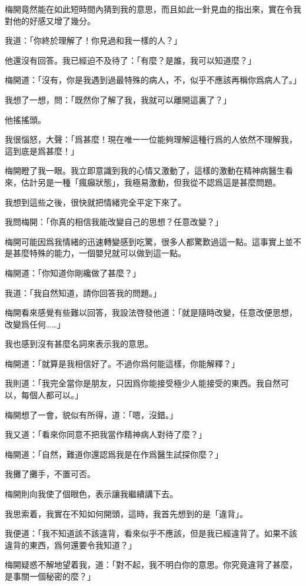 梅開竟然能在如此短時間內猜到我的意思，而且如此一針見血的指出來，實在令我對他的好感又增了幾分。

我道：「你終於理解了！你見過和我一樣的人？」

他還沒有回答。我已經迫不及待了：「有麼？是誰，我可以知道麼？」

梅開道：「沒有，你是我遇到過最特殊的病人，不，似乎不應該再稱你爲病人了。」

我想了一想，問：「既然你了解了我，我就可以離開這裏了？」

他搖搖頭。

我很惱怒，大聲：「爲甚麼！現在唯一一位能夠理解這種行爲的人依然不理解我，這到底是爲甚麼！」

梅開瞪了我一眼。我立即意識到我的心情又激動了，這樣的激動在精神病醫生看來，估計另是一種「瘋癲狀態」，我極易激動，但我從不認爲這是甚麼問題。

我想到這些之後，很快就把情緒完全平定下來了。

我問梅開：「你真的相信我能改變自己的思想？任意改變？」

梅開可能因爲我情緒的迅速轉變感到吃驚，很多人都驚歎過這一點。這事實上並不是甚麼特殊的能力，一個嬰兒就可以做到這一點。

梅開道：「你知道你剛纔做了甚麼？」

我道：「我自然知道，請你回答我的問題。」

梅開看來感覺有些難以回答，我設法啓發他道：「就是隨時改變，任意改便思想，改變爲任何……」

我也感到沒有甚麼名詞來表示我的意思。

梅開道：「就算是我相信好了。不過你爲何能這樣，你能解釋？」

我則道：「我完全當你是朋友，只因爲你能接受極少人能接受的東西。我自然可以，每個人都可以。」

梅開想了一會，貌似有所得，道：「嗯，沒錯。」

我又道：「看來你同意不把我當作精神病人對待了麼？」

梅開道：「自然，難道你還認爲我是在作爲醫生試探你麼？」

我攤了攤手，不置可否。

梅開則向我使了個眼色，表示讓我繼續講下去。

我思索着，我實在不知如何開頭，這時，我首先想到的是「違背」。

我便道：「我不知道該不該違背，看來似乎不應該，但是我已經違背了。如果不該違背的東西，爲何還要令我知道？」

梅開疑惑不解地望着我，道：「對不起，我不明白你的意思。你究竟違背了甚麼，是事關一個秘密的麼？」

